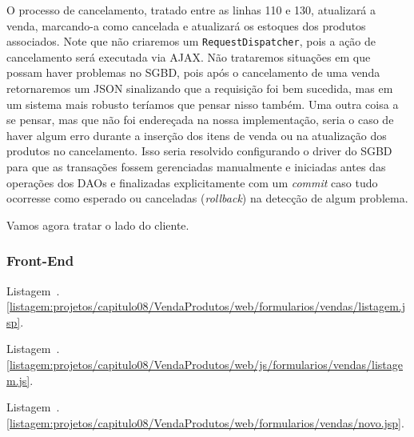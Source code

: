 O processo de cancelamento, tratado entre as linhas 110 e 130, atualizará a venda, marcando-a como cancelada e atualizará os estoques dos produtos associados. Note que não criaremos um \texttt{RequestDispatcher}, pois a ação de cancelamento será executada via AJAX. Não trataremos situações em que possam haver problemas no SGBD, pois após o cancelamento de uma venda retornaremos um JSON sinalizando que a requisição foi bem sucedida, mas em um sistema mais robusto teríamos que pensar nisso também. Uma outra coisa a se pensar, mas que não foi endereçada na nossa implementação, seria o caso de haver algum erro durante a inserção dos itens de venda ou na atualização dos produtos no cancelamento. Isso seria resolvido configurando o driver do SGBD para que as transações fossem gerenciadas manualmente e iniciadas antes das operações dos DAOs e finalizadas explicitamente com um \textit{commit} caso tudo ocorresse como esperado ou canceladas (\textit{rollback}) na detecção de algum problema.

Vamos agora tratar o lado do cliente.

\subsubsection{Front-End}




Listagem~\thechapter.\ref{listagem:projetos/capitulo08/VendaProdutos/web/formularios/vendas/listagem.jsp}.



Listagem~\thechapter.\ref{listagem:projetos/capitulo08/VendaProdutos/web/js/formularios/vendas/listagem.js}.



Listagem~\thechapter.\ref{listagem:projetos/capitulo08/VendaProdutos/web/formularios/vendas/novo.jsp}.



